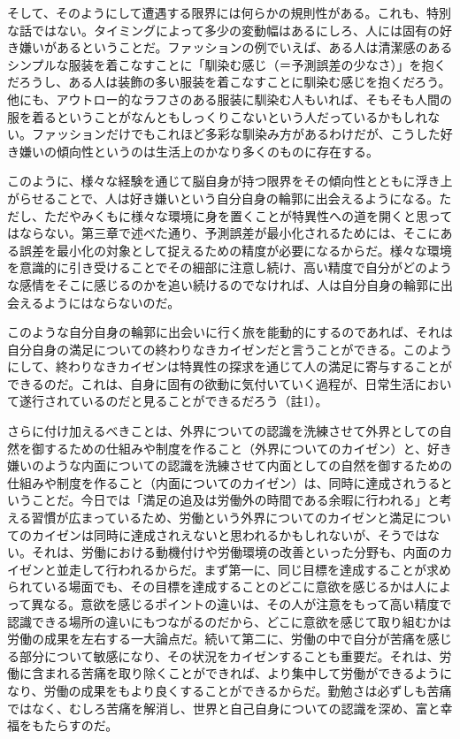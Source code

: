 そして、そのようにして遭遇する限界には何らかの規則性がある。これも、特別な話ではない。タイミングによって多少の変動幅はあるにしろ、人には固有の好き嫌いがあるということだ。ファッションの例でいえば、ある人は清潔感のあるシンプルな服装を着こなすことに「馴染む感じ（＝予測誤差の少なさ）」を抱くだろうし、ある人は装飾の多い服装を着こなすことに馴染む感じを抱くだろう。他にも、アウトロー的なラフさのある服装に馴染む人もいれば、そもそも人間の服を着るということがなんともしっくりこないという人だっているかもしれない。ファッションだけでもこれほど多彩な馴染み方があるわけだが、こうした好き嫌いの傾向性というのは生活上のかなり多くのものに存在する。

このように、様々な経験を通じて脳自身が持つ限界をその傾向性とともに浮き上がらせることで、人は好き嫌いという自分自身の輪郭に出会えるようになる。ただし、ただやみくもに様々な環境に身を置くことが特異性への道を開くと思ってはならない。第三章で述べた通り、予測誤差が最小化されるためには、そこにある誤差を最小化の対象として捉えるための精度が必要になるからだ。様々な環境を意識的に引き受けることでその細部に注意し続け、高い精度で自分がどのような感情をそこに感じるのかを追い続けるのでなければ、人は自分自身の輪郭に出会えるようにはならないのだ。

このような自分自身の輪郭に出会いに行く旅を能動的にするのであれば、それは自分自身の満足についての終わりなきカイゼンだと言うことができる。このようにして、終わりなきカイゼンは特異性の探求を通じて人の満足に寄与することができるのだ。これは、自身に固有の欲動に気付いていく過程が、日常生活において遂行されているのだと見ることができるだろう（註1）。

さらに付け加えるべきことは、外界についての認識を洗練させて外界としての自然を御するための仕組みや制度を作ること（外界についてのカイゼン）と、好き嫌いのような内面についての認識を洗練させて内面としての自然を御するための仕組みや制度を作ること（内面についてのカイゼン）は、同時に達成されうるということだ。今日では「満足の追及は労働外の時間である余暇に行われる」と考える習慣が広まっているため、労働という外界についてのカイゼンと満足についてのカイゼンは同時に達成されえないと思われるかもしれないが、そうではない。それは、労働における動機付けや労働環境の改善といった分野も、内面のカイゼンと並走して行われるからだ。まず第一に、同じ目標を達成することが求められている場面でも、その目標を達成することのどこに意欲を感じるかは人によって異なる。意欲を感じるポイントの違いは、その人が注意をもって高い精度で認識できる場所の違いにもつながるのだから、どこに意欲を感じて取り組むかは労働の成果を左右する一大論点だ。続いて第二に、労働の中で自分が苦痛を感じる部分について敏感になり、その状況をカイゼンすることも重要だ。それは、労働に含まれる苦痛を取り除くことができれば、より集中して労働ができるようになり、労働の成果をもより良くすることができるからだ。勤勉さは必ずしも苦痛ではなく、むしろ苦痛を解消し、世界と自己自身についての認識を深め、富と幸福をもたらすのだ。

